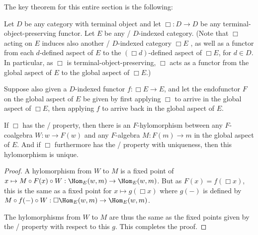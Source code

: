 The key theorem for this entire section is the following:

\begin{theorem}\label{CoalgToAlg}
Let $D$ be any category with terminal object and let $\Box : D \to D$ be any terminal-object-preserving functor. Let $E$ be any \repsmall/ $D$-indexed category. (Note that $\Box$ acting on $E$ induces also another \repsmall/ $D$-indexed category $\Box E$ , as well as a functor from each $d$-defined aspect of $E$ to the $(\Box d)$-defined aspect of $\Box E$, for $d \in D$. In particular, as $\Box$ is terminal-object-preserving, $\Box$ acts as a functor from the global aspect of $E$ to the global aspect of $\Box E$.) 

Suppose also given a $D$-indexed functor $f : \Box E \to E$, and let the endofunctor $F$ on the global aspect of $E$ be given by first applying $\Box$ to arrive in the global aspect of $\Box E$, then applying $f$ to arrive back in the global aspect of $E$.

If $\Box$ has the \Loeb/ property, then there is an $F$-hylomorphism between any $F$-coalgebra $W : w \to F(w)$ and any $F$-algebra $M : F(m) \to m$ in the global aspect of $E$. And if $\Box$ furthermore has the \Loeb/ property with uniqueness, then this hylomorphism is unique.
\end{theorem}
\begin{proof}
A hylomorphism from $W$ to $M$ is a fixed point of $x \mapsto M \circ F(x) \circ W : \Hom_E(w, m) \to \Hom_E(w, m)$. But as $F(x) = f(\Box x)$, this is the same as a fixed point for $x \mapsto g(\Box x)$ where $g(-)$ is defined by $M \circ f(-) \circ W : \Box \Hom_E(w, m) \to \Hom_E(w, m)$. 

The hylomorphisms from $W$ to $M$ are thus the same as the fixed points given by the \Loeb/ property with respect to this $g$. This completes the proof.
\end{proof}

